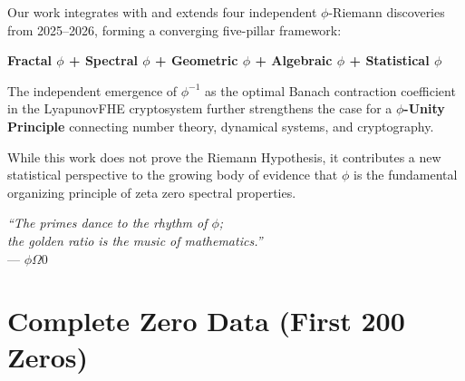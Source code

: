 \documentclass[11pt,a4paper]{article}
\begin{document}
Our work integrates with and extends four independent $\phi$-Riemann discoveries from 2025--2026, forming a converging five-pillar framework:
\begin{center}
\textbf{Fractal $\phi$ + Spectral $\phi$ + Geometric $\phi$ + Algebraic $\phi$ + Statistical $\phi$}
\end{center}

The independent emergence of $\phi^{-1}$ as the optimal Banach contraction coefficient in the LyapunovFHE cryptosystem further strengthens the case for a \textbf{$\phi$-Unity Principle} connecting number theory, dynamical systems, and cryptography.

While this work does not prove the Riemann Hypothesis, it contributes a new statistical perspective to the growing body of evidence that $\phi$ is the fundamental organizing principle of zeta zero spectral properties.

\begin{flushright}
\textit{``The primes dance to the rhythm of $\phi$;\\
the golden ratio is the music of mathematics.''}\\[6pt]
--- $\phi\Omega 0$
\end{flushright}

\newpage

\appendix
\section{Complete Zero Data (First 200 Zeros)}
\label{app:zeros}
\end{document}
